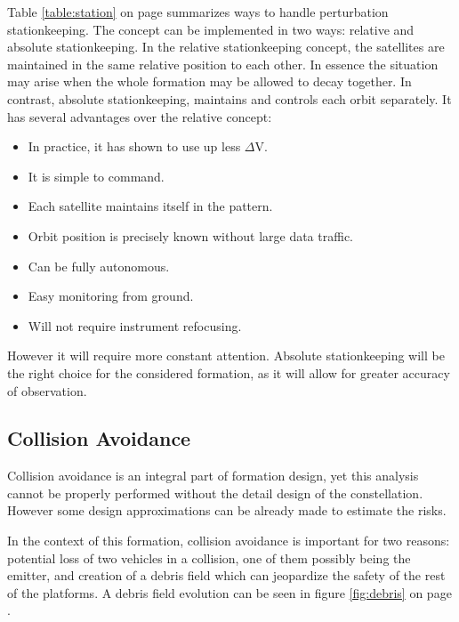 Table \ref{table:station} on page \pageref{table:station} summarizes ways to handle perturbation stationkeeping. The concept can be implemented in two ways: relative and absolute stationkeeping. In the relative stationkeeping concept, the satellites are maintained in the same relative position to each other. In essence the situation may arise when the whole formation may be allowed to decay together. In contrast, absolute stationkeeping, maintains and controls each orbit separately. It has several advantages over the relative concept:

\begin{itemize}
	\item In practice, it has shown to use up less $\Delta$V.
	\item It is simple to command.
	\item Each satellite maintains itself in the pattern.
	\item Orbit position is precisely known without large data traffic.
	\item Can be fully autonomous.
	\item Easy monitoring from ground.
	\item Will not require instrument refocusing.
\end{itemize}
 
However it will require more constant attention. Absolute stationkeeping will be the right choice for the considered formation, as it will allow for greater accuracy of observation.    

\subsection{Collision Avoidance}
\label{mtrSwarmCollision}
Collision avoidance is an integral part of formation design, yet this analysis cannot be properly performed without the detail design of the constellation. However some design approximations can be already made to estimate the risks.

In the context of this formation, collision avoidance is important for two reasons: potential loss of two vehicles in a collision, one of them possibly being the emitter, and creation of a debris field which can jeopardize the safety of the rest of the platforms. A debris field evolution can be seen in figure \ref{fig:debris} on page \pageref{fig:debris}. 

